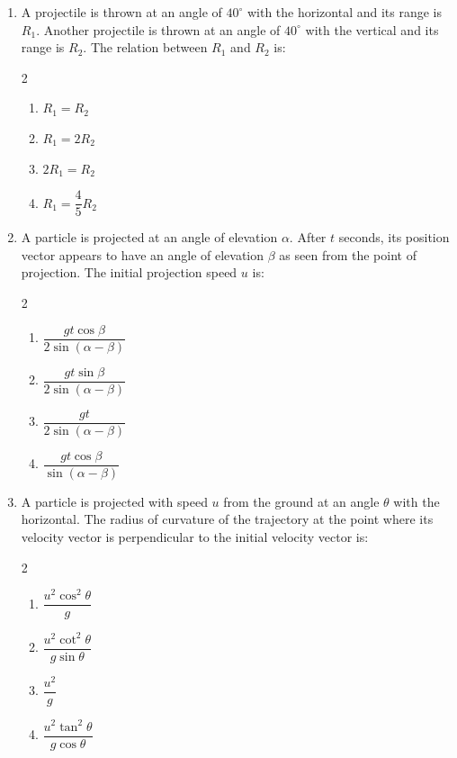 \documentclass[11pt,a4paper]{article}
\begin{document}
\begin{enumerate}[label=\textbf{\textcolor{l1Green}{Q\arabic*.}},leftmargin=24pt,itemsep=10pt]
  \item A projectile is thrown at an angle of $40^\circ$ with the horizontal and its range is $R_1$. Another projectile is thrown at an angle of $40^\circ$ with the vertical and its range is $R_2$. The relation between $R_1$ and $R_2$ is:
  \begin{multicols}{2}
  \begin{enumerate}[label=\textbf{\textcolor{primaryDark}{(\Alph*)}},itemsep=2pt]
    \item $R_1 = R_2$
    \item $R_1 = 2R_2$
    \item $2R_1 = R_2$
    \item $R_1 = \dfrac{4}{5}R_2$
  \end{enumerate}
  \end{multicols}

  \item A particle is projected at an angle of elevation $\alpha$. After $t$ seconds, its position vector appears to have an angle of elevation $\beta$ as seen from the point of projection. The initial projection speed $u$ is:
  \begin{multicols}{2}
  \begin{enumerate}[label=\textbf{\textcolor{primaryDark}{(\Alph*)}},itemsep=2pt]
    \item $\dfrac{gt\cos\beta}{2\sin(\alpha - \beta)}$
    \item $\dfrac{gt\sin\beta}{2\sin(\alpha - \beta)}$
    \item $\dfrac{gt}{2\sin(\alpha - \beta)}$
    \item $\dfrac{gt\cos\beta}{\sin(\alpha - \beta)}$
  \end{enumerate}
  \end{multicols}

  \item A particle is projected with speed $u$ from the ground at an angle $\theta$ with the horizontal. The radius of curvature of the trajectory at the point where its velocity vector is perpendicular to the initial velocity vector is:
  \begin{multicols}{2}
  \begin{enumerate}[label=\textbf{\textcolor{primaryDark}{(\Alph*)}},itemsep=2pt]
    \item $\dfrac{u^2\cos^2\theta}{g}$
    \item $\dfrac{u^2\cot^2\theta}{g\sin\theta}$
    \item $\dfrac{u^2}{g}$
    \item $\dfrac{u^2\tan^2\theta}{g\cos\theta}$
  \end{enumerate}
  \end{multicols}


\end{enumerate}
\end{document}
